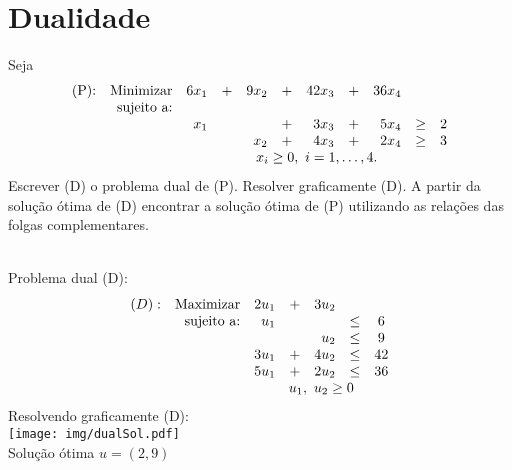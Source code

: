 \documentclass[12pt]{exam}
\begin{document}
\section*{Dualidade}

\begin{questions}

\question Seja
	\begin{equation*}
		  \begin{array}{crrrrrrrrcc}
 \text{(P):} & \text{Minimizar} & 6x_1 & + & 9x_2 & + & 42x_3 & + & 36x_4   &      & \\   
  	   & \text{sujeito a:}&        &   &      &   & &  & &  & \\
  	   &                 &  x_1 &     &         & + & 3x_3 & + & 5x_4    &  \geq & 2 \\
  	   &                &         &     &   x_2& + & 4x_3 & + & 2x_4    & \geq& 3\\
  	   &                 &   \multicolumn{9}{c}{x_i \geq 0,~ i=1,\dots,4.}      
		  \end{array}	
	\end{equation*}
Escrever (D) o problema dual de (P). Resolver graficamente (D). A partir da solução ótima de (D) encontrar a solução ótima de (P) utilizando as relações das folgas complementares.
	\begin{solution}\\
	Problema dual (D):\\
	\begin{equation*}	
				\begin{array}{c r r c r c c }
			(D) :&  \text{Maximizar}   & 2u_1 & +  & 3u_2 \\
			& \text{sujeito a:} & u_1   &    &           & \leq   & 6 \\
			&                           &          &    & u_2    & \leq   & 9 \\
			&                           & 3u_1 & + & 4u_2  & \leq  & 42 \\
			&                           & 5u_1 & + &  2u_2 & \leq   &  36 \\			
			&                           & \multicolumn{5}{c}{u_1,~u_2 \geq 0}
			\end{array}
	\end{equation*}
	Resolvendo graficamente (D):\\
	\texttt{[image: img/dualSol.pdf]} \\ 
	Solução ótima $u = (2,9)$
	\\ \ \\

\end{solution}
\end{questions}
\end{document}
